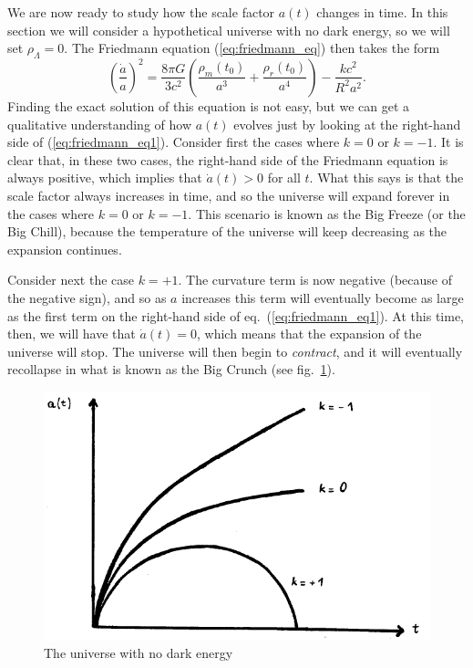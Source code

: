 \documentclass[11pt, a4paper,oneside,openright]{book}
\numberwithin{equation}{section}
\begin{document}
We are now ready to study how the scale factor $a(t)$ changes in time. In this section we will consider a hypothetical universe with no dark energy, so we will set $\rho_{\Lambda}=0$. The Friedmann equation (\ref{eq:friedmann_eq}) then takes the form
\begin{equation} \label{eq:friedmann_eq1}
\left(\frac{\dot{a}}{a}\right)^2=\frac{8\pi G}{3c^2}\left( \frac{\rho_m(t_0)}{a^3}+\frac{\rho_r(t_0)}{a^4} \right)-\frac{kc^2}{R^2a^2}.
\end{equation}
Finding the exact solution of this equation is not easy, but we can get a qualitative understanding of how $a(t)$ evolves just by looking at the right-hand side of (\ref{eq:friedmann_eq1}). Consider first the cases where $k=0$ or $k=-1$. It is clear that, in these two cases, the right-hand side of the Friedmann equation is always positive, which implies that $\dot{a}(t)>0$ for all $t$. What this says is that the scale factor always increases in time, and so the universe will expand forever in the cases where $k=0$ or $k=-1$. This scenario is known as the Big Freeze (or the Big Chill), because the temperature of the universe will keep decreasing as the expansion continues.

Consider next the case $k=+1$. The curvature term is now negative (because of the negative sign), and so as $a$ increases this term will eventually become as large as the first term on the right-hand side of eq.\ (\ref{eq:friedmann_eq1}). At this time, then, we will have that $\dot{a}(t)=0$, which means that the expansion of the universe will stop. The universe will then begin to {\it contract}, and it will eventually recollapse in what is known as the Big Crunch (see fig.\ \ref{fig:lec6_3}).
\begin{figure}[ht]
\begin{center}
\includegraphics[scale=0.5]{Draw/lec6_3.png}
\end{center}
\caption{The universe with no dark energy}
\label{fig:lec6_3}
\end{figure}
\end{document}
